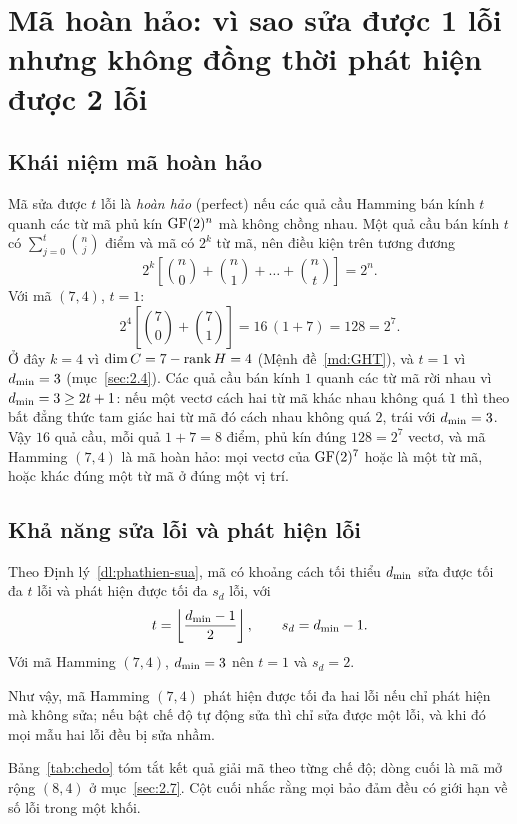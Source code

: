 \section{Mã hoàn hảo: vì sao sửa được 1 lỗi nhưng không đồng thời phát hiện được 2 lỗi}
\label{sec:2.5}

\subsection{Khái niệm mã hoàn hảo}
\label{ss:2.5.1}

Mã sửa được $t$ lỗi là \emph{hoàn hảo} (perfect) nếu các quả cầu Hamming bán
kính $t$ quanh các từ mã phủ kín $\mathrm{GF}(2)^{n}$ mà không chồng nhau. Một quả cầu bán
kính $t$ có $\sum_{j=0}^{t}\binom{n}{j}$ điểm và mã có $2^k$ từ mã, nên điều
kiện trên tương đương
\[
  2^k\left[\binom{n}{0} + \binom{n}{1} + \dots + \binom{n}{t}\right] = 2^n .
\]
Với mã $(7,4)$, $t = 1$:
\[
  2^4\left[\binom{7}{0} + \binom{7}{1}\right] = 16\,(1 + 7) = 128 = 2^7 .
\]
Ở đây $k = 4$ vì $\dim C = 7 - \operatorname{rank} H = 4$ (Mệnh đề~\ref{md:GHT}), và $t = 1$
vì $d_{\min} = 3$ (mục~\ref{sec:2.4}). Các quả cầu bán kính $1$ quanh các từ mã
rời nhau vì $d_{\min} = 3 \ge 2t + 1$: nếu một vectơ cách hai từ mã khác nhau
không quá $1$ thì theo bất đẳng thức tam giác hai từ mã đó cách nhau không quá
$2$, trái với $d_{\min} = 3$. Vậy $16$ quả cầu, mỗi quả $1 + 7 = 8$ điểm, phủ kín
đúng $128 = 2^7$ vectơ, và mã Hamming $(7,4)$ là mã hoàn hảo: mọi vectơ của
$\mathrm{GF}(2)^{7}$ hoặc là một từ mã, hoặc khác đúng một từ mã ở đúng một vị trí.

\subsection{Khả năng sửa lỗi và phát hiện lỗi}
\label{ss:2.5.2}

Theo Định lý~\ref{dl:phathien-sua}, mã có khoảng cách tối thiểu $d_{\min}$ sửa
được tối đa $t$ lỗi và phát hiện được tối đa $s_d$ lỗi, với
\[
  t = \left\lfloor \frac{d_{\min} - 1}{2} \right\rfloor, \qquad
  s_d = d_{\min} - 1 .
\]
Với mã Hamming $(7,4)$, $d_{\min} = 3$ nên $t = 1$ và $s_d = 2$.
\begin{ketluan}
Như vậy, mã Hamming $(7,4)$ phát hiện được tối đa hai lỗi nếu chỉ phát hiện mà
không sửa; nếu bật chế độ tự động sửa thì chỉ sửa được một lỗi, và khi đó mọi
mẫu hai lỗi đều bị sửa nhầm.
\end{ketluan}

Bảng~\ref{tab:chedo} tóm tắt kết quả giải mã theo từng chế độ; dòng cuối là mã
mở rộng $(8,4)$ ở mục~\ref{sec:2.7}. Cột cuối nhắc rằng mọi bảo đảm đều có giới
hạn về số lỗi trong một khối.

